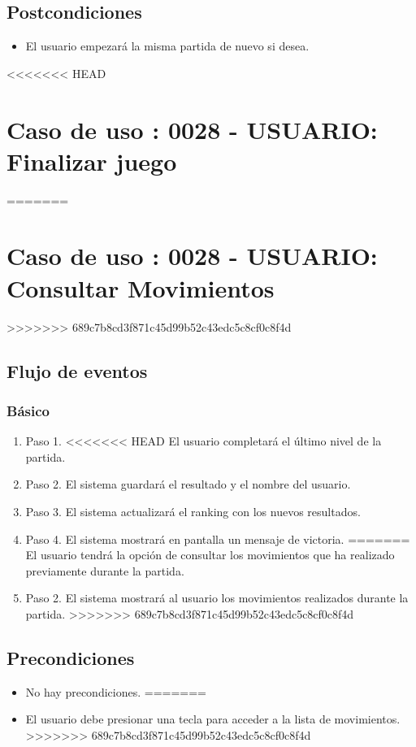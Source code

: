 \subsection{Postcondiciones}
\begin{itemize}
\item El usuario empezará la misma partida de nuevo si desea. 
\end{itemize}



<<<<<<< HEAD
\section{Caso de uso : 0028 - USUARIO: Finalizar juego}\label{sec:uc0}
=======
\section{Caso de uso : 0028 - USUARIO: Consultar Movimientos}\label{sec:uc0}
>>>>>>> 689c7b8cd3f871c45d99b52c43edc5c8cf0c8f4d
\subsection{Flujo de eventos}
\subsubsection{Básico}

\begin{enumerate}
\item Paso 1.
<<<<<<< HEAD
El usuario completará el último nivel de la partida.
\item Paso 2.
El sistema guardará el resultado y el nombre del usuario.
\item Paso 3.
El sistema actualizará el ranking con los nuevos resultados.
\item Paso 4.
El sistema mostrará en pantalla un mensaje de victoria.
=======
El usuario tendrá la opción de consultar los movimientos que ha realizado previamente durante la partida. 
\item Paso 2.
El sistema mostrará al usuario los movimientos realizados durante la partida.
>>>>>>> 689c7b8cd3f871c45d99b52c43edc5c8cf0c8f4d
\end{enumerate}

\subsection{Precondiciones}
\begin{itemize}
<<<<<<< HEAD
\item No hay precondiciones.
=======
\item El usuario debe presionar una tecla para acceder a la lista de movimientos.
>>>>>>> 689c7b8cd3f871c45d99b52c43edc5c8cf0c8f4d
\end{itemize}

